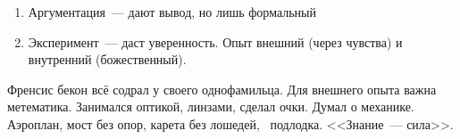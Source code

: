 \begin{enumerate}
	\item Аргументация~--- дают вывод, но лишь формальный
	\item Эксперимент~--- даст уверенность. Опыт внешний (через чувства) и внутренний (божественный).
\end{enumerate}
Френсис бекон всё содрал у своего однофамильца.
Для внешнего опыта важна метематика. Занимался оптикой, линзами, сделал очки. Думал о механике. Аэроплан, мост без опор, карета без лошедей, ~подлодка. <<Знание~--- сила>>.
